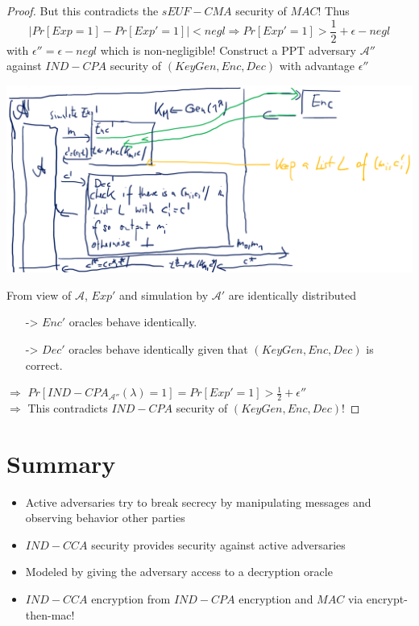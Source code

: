 \begin{proof}
		But this contradicts the $sEUF-CMA$ security of $MAC$! Thus
		$$|Pr[Exp=1]-Pr[Exp'=1]| < negl \Rightarrow Pr[Exp'=1] > \frac{1}{2} + \epsilon - negl$$
		with $\epsilon'' = \epsilon - negl$ which is non-negligible!
\newpage
		Construct a PPT adversary $\mathcal{A}''$ against $IND-CPA$ security of $(KeyGen,Enc,Dec)$ with advantage $\epsilon''$
		\begin{center}
			\includegraphics[width=160mm]{Graphics/Chosen Ciphertext Security/ccs5.png}
		\end{center}
		From view of $\mathcal{A}$, $Exp'$ and simulation by $\mathcal{A}'$ are identically distributed
		\begin{itemize}
			\item[->] $Enc'$ oracles behave identically.
			\item[->] $Dec'$ oracles behave identically given that $(KeyGen,Enc,Dec)$ is correct.
		\end{itemize}
		$\Rightarrow$ $Pr[IND-CPA_{\mathcal{A}''}(\lambda)=1] = Pr[Exp'=1] > \frac{1}{2} + \epsilon''$\\
		$\Rightarrow$ This contradicts $IND-CPA$ security of $(KeyGen,Enc,Dec)$!
	\end{proof}

\section{Summary}
	\begin{itemize}
		\item Active adversaries try to break secrecy by manipulating messages and observing behavior other parties
		\item $IND-CCA$ security provides security against active adversaries
		\item Modeled by giving the adversary access to a decryption oracle
		\item $IND-CCA$ encryption from $IND-CPA$ encryption and $MAC$ via encrypt-then-mac!
	\end{itemize}
	

